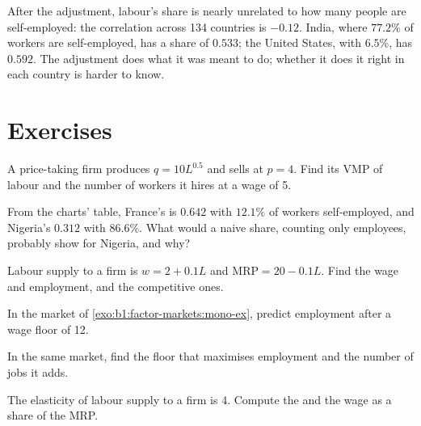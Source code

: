 After the adjustment, labour's share is nearly unrelated to how many
people are self-employed: the correlation across 134 countries is $-0.12$.
India, where $77.2\%$ of workers are self-employed, has a share of $0.533$; the
United States, with $6.5\%$, has $0.592$. %
The adjustment does what it was meant to do; whether it does it right in
each country is harder to know.

\section*{Exercises}\label{sec:b1:factor-markets:exercises}

\begin{exercise}[$\star$]\label{exo:b1:factor-markets:vmp-ex}
A price-taking firm produces $q = 10L^{0.5}$ and sells at $p = 4$. Find its VMP of
labour and the number of workers it hires at a wage of 5.
\end{exercise}

\begin{exercise}[$\star$]\label{exo:b1:factor-markets:read}
From the charts' table, France's  is $0.642$ with $12.1\%$ of
workers self-employed, and Nigeria's $0.312$ with $86.6\%$. %
What would a naive share, counting only employees, probably show for
Nigeria, and why?
\end{exercise}

\begin{exercise}[$\star$]\label{exo:b1:factor-markets:mono-ex}
Labour supply to a firm is $w = 2 + 0.1L$ and $\mathrm{MRP} = 20 - 0.1L$. Find the
 wage and employment, and the competitive ones.
\end{exercise}

\begin{exercise}[$\star$]\label{exo:b1:factor-markets:floor12}
In the market of \cref{exo:b1:factor-markets:mono-ex}, predict employment
after a wage floor of 12.
\end{exercise}

\begin{exercise}[$\star\star$]\label{exo:b1:factor-markets:best-floor}
In the same market, find the floor that maximises employment and the
number of jobs it adds.
\end{exercise}

\begin{exercise}[$\star\star$]\label{exo:b1:factor-markets:markdown4}
The elasticity of labour supply to a firm is 4. Compute the  and
the wage as a share of the MRP.
\end{exercise}

